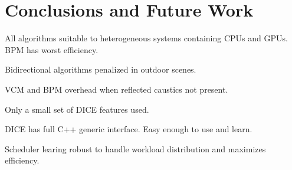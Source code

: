 \chapter{Conclusions and Future Work}

All algorithms suitable to heterogeneous systems containing CPUs and GPUs. BPM has worst efficiency.

Bidirectional algorithms penalized in outdoor scenes.

VCM and BPM overhead when reflected caustics not present.

Only a small set of DICE features used.

DICE has full C++ generic interface. Easy enough to use and learn.

Scheduler learing robust to handle workload distribution and maximizes efficiency.

